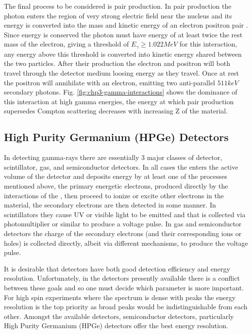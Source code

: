 The final process to be considered is pair production. In pair production the photon enters the region of very strong electric field near the nucleus and its energy is converted into the mass and kinetic energy of an electron positron pair \cite{anderson-PhysRev.43.491,oppenheimer_PhysRev.44.53.2}. Since energy is conserved the photon must have energy of at least twice the rest mass of the electron, giving a threshold of $E_{\gamma}\geq1.022MeV$ for this interaction, any energy above this threshold is converted into kinetic energy shared between the two particles. After their production the electron and positron will both travel through the detector medium loosing energy as they travel. Once at rest the positron will annihilate with an electron, emitting two anti-parallel $511keV$ secondary photons. Fig. \ref{fig:chp3-gamma-interactions} shows the dominance of this interaction at high gamma energies, the energy at which pair production supersedes Compton scattering decreases with increasing Z of the material.

\subsection{High Purity Germanium (HPGe) Detectors}
\label{ssec:exp-pr-gamma-spec-hpge}
In detecting gamma-rays there are essentially 3 major classes of detector, scintillator, gas, and semiconductor detectors. In all cases the \gr{} enters the active volume of the detector and deposits energy by at least one of the processes mentioned above, the primary energetic electrons, produced directly by the interactions of the \gr{}, then proceed to ionize or excite other electrons in the material, the secondary electrons are then detected in some manner. In scintillators they cause UV or visible light to be emitted and that is collected via photomultiplier or similar to produce a voltage pulse. In gas and semiconductor detectors the charge of the secondary electrons (and their corresponding ions or holes) is collected directly, albeit via different mechanisms, to produce the voltage pulse.

It is desirable that \gr{} detectors have both good detection efficiency and energy resolution. Unfortunately, in the \gr{} detectors presently available there is a conflict between these goals and so one must decide which parameter is more important. For high spin experiments where the spectrum is dense with peaks the energy resolution is the top priority as broad peaks would be indistinguishable from each other. Amongst the available detectors, semiconductor detectors, particularly High Purity Germanium (HPGe) detectors offer the best energy resolution.

